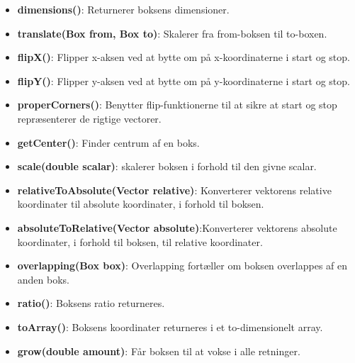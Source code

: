 \begin{itemize}
	\item \textbf{dimensions()}: Returnerer boksens dimensioner.
	\item \textbf{translate(Box from, Box to)}: Skalerer fra from-boksen til to-boxen.
	\item \textbf{flipX()}: Flipper x-aksen ved at bytte om på x-koordinaterne i start og stop.
	\item \textbf{flipY()}: Flipper y-aksen ved at bytte om på y-koordinaterne i start og stop.
	\item \textbf{properCorners()}: Benytter flip-funktionerne til at sikre at start og stop repræsenterer de rigtige vectorer.
	\item \textbf{getCenter()}: Finder centrum af en boks.
	\item \textbf{scale(double scalar)}: skalerer boksen i forhold til den givne scalar.
	\item \textbf{relativeToAbsolute(Vector relative)}: Konverterer vektorens relative koordinater til absolute koordinater, i forhold til boksen.
	\item \textbf{absoluteToRelative(Vector absolute)}:Konverterer vektorens absolute koordinater, i forhold til boksen, til relative koordinater.
	\item \textbf{overlapping(Box box)}: Overlapping fortæller om boksen overlappes af en anden boks.
	\item \textbf{ratio()}: Boksens ratio returneres.
	\item \textbf{toArray()}: Boksens koordinater returneres i et to-dimensionelt array.
	\item \textbf{grow(double amount)}: Får boksen til at vokse i alle retninger.
\end{itemize}